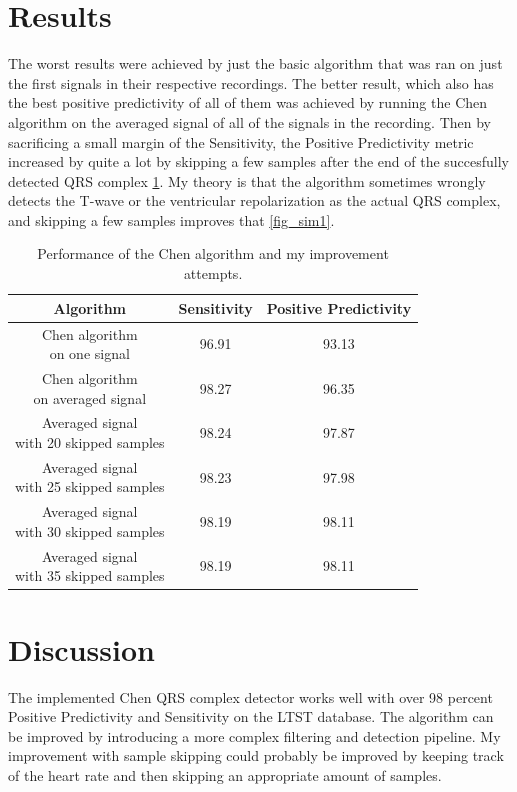 \documentclass[9pt]{IEEEtran}
\begin{document}
\section{Results}

The worst results were achieved by just the basic algorithm that was ran on just the first signals in their respective recordings. The better result, which also has the best positive predictivity of all of them was achieved by running the Chen algorithm on the averaged signal of all of the signals in the recording. Then by sacrificing a small margin of the Sensitivity, the Positive Predictivity metric increased by quite a lot by skipping a few samples after the end of the succesfully detected QRS complex \ref{table2}. My theory is that the algorithm sometimes wrongly detects the T-wave or the ventricular repolarization as the actual QRS complex, and skipping a few samples improves that \ref{fig_sim1}.

\begin{table}[!htb]
\scriptsize
\renewcommand{\arraystretch}{1.3}
\centering
\begin{tabular}{|c||c|c|}\hline
\bf{Algorithm} & \bf{Sensitivity} & \bf{Positive Predictivity} \\ \hline \hline 
 \makecell{Chen algorithm \\ on one signal }  & 96.91 & 93.13 \\ \hline
 \makecell{Chen algorithm \\ on averaged signal } & 98.27 & 96.35 \\ \hline
 \makecell{Averaged signal \\ with 20 skipped samples}  & 98.24 & 97.87 \\ \hline
 \makecell{Averaged signal \\ with 25 skipped samples}   & 98.23 & 97.98 \\ \hline
 \makecell{Averaged signal \\ with 30 skipped samples}  & 98.19  & 98.11 \\ \hline
 \makecell{Averaged signal \\ with 35 skipped samples}  & 98.19  & 98.11 \\ \hline
\end{tabular}
\caption{Performance of the Chen algorithm and my improvement attempts. }
\label{table2}
\end{table}

\section{Discussion}

The implemented Chen QRS complex detector works well with over 98 percent Positive Predictivity and Sensitivity on the LTST database. The algorithm can be improved by introducing a more complex filtering and detection pipeline. My improvement with sample skipping could probably be improved by keeping track of the heart rate and then skipping an appropriate amount of samples.



\end{document}
